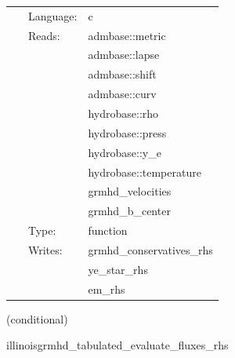  \begin{tabular*}{160mm}{cll} 
~ & Language:  & c \\ 
~ & Reads:  & admbase::metric \\ 
~& ~ &admbase::lapse\\ 
~& ~ &admbase::shift\\ 
~& ~ &admbase::curv\\ 
~& ~ &hydrobase::rho\\ 
~& ~ &hydrobase::press\\ 
~& ~ &hydrobase::y\_e\\ 
~& ~ &hydrobase::temperature\\ 
~& ~ &grmhd\_velocities\\ 
~& ~ &grmhd\_b\_center\\ 
~ & Type:  & function \\ 
~ & Writes:  & grmhd\_conservatives\_rhs \\ 
~& ~ &ye\_star\_rhs\\ 
~& ~ &em\_rhs\\ 
\end{tabular*} 


\vspace{5mm}

   (conditional) 

\hspace{5mm} illinoisgrmhd\_tabulated\_evaluate\_fluxes\_rhs 

\hspace{5mm}{\it tabulated version of illinoisgrmhd\_evaluate\_fluxes\_rhs } 


\hspace{5mm}

